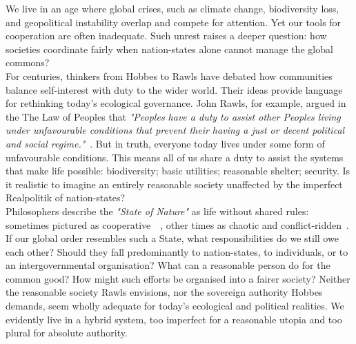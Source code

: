 \documentclass[12pt, oneside]{article}   	%
\begin{document}
We live in an age where global crises, such as climate change, biodiversity loss, and geopolitical instability overlap and compete for attention.
Yet our tools for cooperation are often inadequate.
Such unrest raises a deeper question: how societies coordinate fairly when nation-states alone cannot manage the global commons?\\

For centuries, thinkers from Hobbes to Rawls have debated how communities balance self-interest with duty to the wider world.
Their ideas provide language for rethinking today's ecological governance.
John Rawls, for example, argued in the The Law of Peoples that \emph{"Peoples have a duty to assist other Peoples living under unfavourable conditions that prevent their having a just or decent political and social regime."}~\cite{jr2}.
But in truth, everyone today lives under some form of unfavourable conditions.
This means all of us share a duty to assist the systems that make life possible: biodiversity; basic utilities; reasonable shelter; security.
Is it realistic to imagine an entirely reasonable society unaffected by the imperfect Realpolitik of nation-states?\\

Philosophers describe the \emph{"State of Nature"} as life without shared rules: sometimes pictured as cooperative~\cite{jl1}~\cite{rn1}, other times as chaotic and conflict-ridden~\cite{th1}.
If our global order resembles such a State, what responsibilities do we still owe each other?
Should they fall predominantly to nation-states, to individuals, or to an intergovernmental organisation?
What can a reasonable person do for the common good?
How might such efforts be organised into a fairer society?
Neither the reasonable society Rawls envisions, nor the sovereign authority Hobbes demands, seem wholly adequate for today's ecological and political realities.
We evidently live in a hybrid system, too imperfect for a reasonable utopia and too plural for absolute authority.\\
\end{document}
